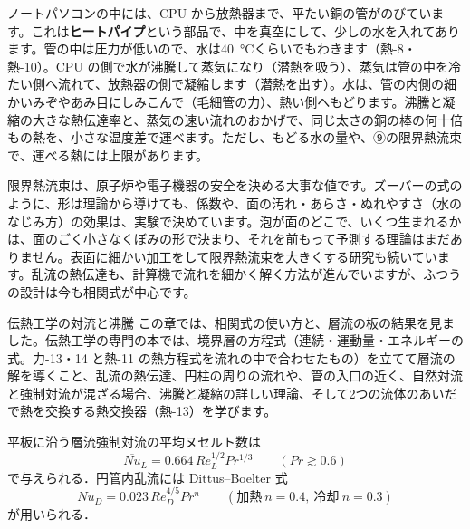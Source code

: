 \begin{motto}[4]
ノートパソコンの中には、CPU から放熱器まで、平たい銅の管がのびています。これは\textbf{ヒートパイプ}という部品で、中を真空にして、少しの水を入れてあります。管の中は圧力が低いので、水は\qty{40}{\celsius}くらいでもわきます（熱-8・熱-10）。CPU の側で水が沸騰して蒸気になり（潜熱を吸う）、蒸気は管の中を冷たい側へ流れて、放熱器の側で凝縮します（潜熱を出す）。水は、管の内側の細かいみぞやあみ目にしみこんで（毛細管の力）、熱い側へもどります。沸騰と凝縮の大きな熱伝達率と、蒸気の速い流れのおかげで、同じ太さの銅の棒の何十倍もの熱を、小さな温度差で運べます。ただし、もどる水の量や、⑨の限界熱流束で、運べる熱には上限があります。
\end{motto}

\begin{phmada}
限界熱流束は、原子炉や電子機器の安全を決める大事な値です。ズーバーの式のように、形は理論から導けても、係数や、面の汚れ・あらさ・ぬれやすさ（水のなじみ方）の効果は、実験で決めています。泡が面のどこで、いくつ生まれるかは、面のごく小さなくぼみの形で決まり、それを前もって予測する理論はまだありません。表面に細かい加工をして限界熱流束を大きくする研究も続いています。乱流の熱伝達も、計算機で流れを細かく解く方法が進んでいますが、ふつうの設計は今も相関式が中心です。
\end{phmada}

\begin{phsaki}{伝熱工学の対流と沸騰}
この章では、相関式の使い方と、層流の板の結果を見ました。伝熱工学の専門の本では、境界層の方程式（連続・運動量・エネルギーの式。力-13・14 と熱-11 の熱方程式を流れの中で合わせたもの）を立てて層流の解を導くこと、乱流の熱伝達、円柱の周りの流れや、管の入口の近く、自然対流と強制対流が混ざる場合、沸騰と凝縮の詳しい理論、そして2つの流体のあいだで熱を交換する熱交換器（熱-13）を学びます。
\end{phsaki}

\begin{senmonsho}[伝熱工学の専門書の書き方]
\begin{bkhonbun}
平板に沿う層流強制対流の平均ヌセルト数は
\[ \overline{Nu}_L=0.664\,Re_L^{1/2}Pr^{1/3}\qquad(Pr\gtrsim0.6) \]
で与えられる．円管内乱流には Dittus--Boelter 式
\[ Nu_D=0.023\,Re_D^{4/5}Pr^n\qquad(\text{加熱}\ n=0.4,\ \text{冷却}\ n=0.3) \]
が用いられる．
\end{bkhonbun}
\end{senmonsho}

